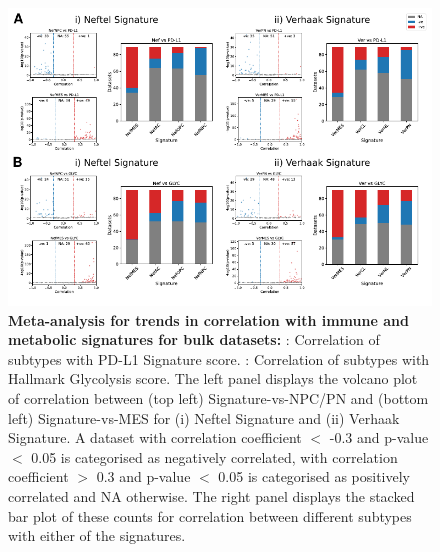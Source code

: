 \documentclass[11pt,a4paper]{article}
\begin{document}
\begin{figure}[ht]
    \begin{subfigure}[c]{\textwidth}
        \label{metapdl1}
    \end{subfigure}
    \begin{subfigure}[c]{\textwidth}
        \label{metaglyc}
    \end{subfigure}
    \centering
    \includegraphics[width=\textwidth]{Figure5}
    \caption{\textbf{Meta-analysis for trends in correlation with immune and metabolic signatures for bulk datasets:} : Correlation of subtypes with PD-L1 Signature score. : Correlation of subtypes with Hallmark Glycolysis score. The left panel displays the volcano plot of correlation between (top left) Signature-vs-NPC/PN and (bottom left) Signature-vs-MES for (i) Neftel Signature and (ii) Verhaak Signature. A dataset with correlation coefficient $<$ -0.3 and p-value $<$ 0.05 is categorised as negatively correlated, with correlation coefficient $>$ 0.3 and p-value $<$ 0.05 is categorised as positively correlated and NA otherwise. The right panel displays the stacked bar plot of these counts for correlation between different subtypes with either of the signatures.}
    \label{metaxis}
\end{figure}
\end{document}
